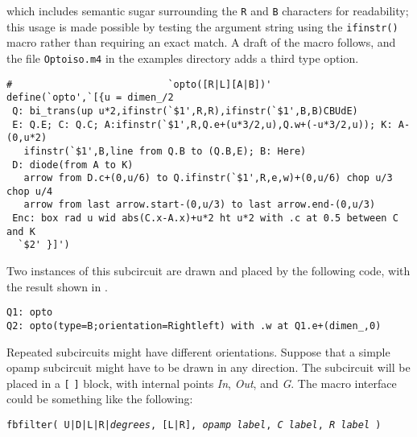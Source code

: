 \noindent
which includes semantic sugar surrounding the {\tt R} and {\tt B} characters
for readability; this usage is made possible by testing the argument string
using the {\tt ifinstr()} macro rather than requiring an exact match.
A draft of the macro follows, and the file {\tt Optoiso.m4} in the examples
directory adds a third type option.
\begin{verbatim}
#                           `opto([R|L][A|B])'
define(`opto',`[{u = dimen_/2
 Q: bi_trans(up u*2,ifinstr(`$1',R,R),ifinstr(`$1',B,B)CBUdE)
 E: Q.E; C: Q.C; A:ifinstr(`$1',R,Q.e+(u*3/2,u),Q.w+(-u*3/2,u)); K: A-(0,u*2)
   ifinstr(`$1',B,line from Q.B to (Q.B,E); B: Here)
 D: diode(from A to K)
   arrow from D.c+(0,u/6) to Q.ifinstr(`$1',R,e,w)+(0,u/6) chop u/3 chop u/4
   arrow from last arrow.start-(0,u/3) to last arrow.end-(0,u/3)
 Enc: box rad u wid abs(C.x-A.x)+u*2 ht u*2 with .c at 0.5 between C and K
  `$2' }]')
\end{verbatim}
Two instances of this subcircuit are
drawn and placed by the following code, with the result
shown in .
\begin{verbatim}
Q1: opto
Q2: opto(type=B;orientation=Rightleft) with .w at Q1.e+(dimen_,0)
\end{verbatim}


\iffalse
{}
Repeated subcircuits might have different orientations.
Suppose that a simple opamp subcircuit might have to be drawn in any direction.
The subcircuit will be placed in a {\tt [} {\tt ]} block, with
internal points {\sl In}, {\sl Out}, and {\sl G}. 
The macro interface could be something like the following:

{\tt fbfilter( U|D|L|R|{\sl degrees}, [L|R], {\sl opamp label},
  {\sl C label}, {\sl R label} )}

